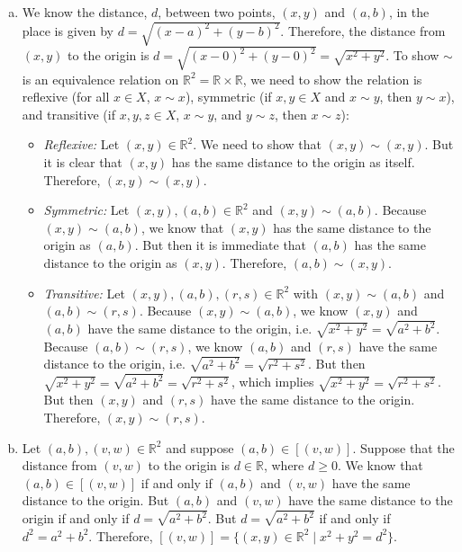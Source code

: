 \documentclass[11pt,letterpaper]{article}
\begin{document}
\sol 
\begin{enumerate}[(a)]
\item We know the distance, $d$, between two points, $(x, y)$ and $(a, b)$, in the place is given by $d= \sqrt{(x - a)^2 + (y - b)^2}$. Therefore, the distance from $(x, y)$ to the origin is $d= \sqrt{(x - 0)^2 + (y - 0)^2}= \sqrt{x^2 + y^2}$. To show $\sim$ is an equivalence relation on $\mathbb{R}^2= \mathbb{R} \times \mathbb{R}$, we need to show the relation is reflexive (for all $x \in X$, $x \sim x$), symmetric (if $x, y \in X$ and $x \sim y$, then $y \sim x$), and transitive (if $x, y, z \in X$, $x \sim y$, and $y \sim z$, then $x \sim z$):
	\begin{itemize}
	\item \textit{Reflexive:} Let $(x, y) \in \mathbb{R}^2$. We need to show that $(x, y) \sim (x, y)$. But it is clear that $(x, y)$ has the same distance to the origin as itself. Therefore, $(x, y) \sim (x, y)$. 
	
	\item \textit{Symmetric:} Let $(x, y), (a, b) \in \mathbb{R}^2$ and $(x, y) \sim (a, b)$. Because $(x, y) \sim (a, b)$, we know that $(x, y)$ has the same distance to the origin as $(a, b)$. But then it is immediate that $(a, b)$ has the same distance to the origin as $(x, y)$. Therefore, $(a, b) \sim (x, y)$. 
	
	\item \textit{Transitive:} Let $(x, y), (a, b), (r, s) \in \mathbb{R}^2$ with $(x, y) \sim (a, b)$ and $(a, b) \sim (r, s)$. Because $(x, y) \sim (a, b)$, we know $(x, y)$ and $(a, b)$ have the same distance to the origin, i.e. $\sqrt{x^2+ y^2}= \sqrt{a^2 + b^2}$. Because $(a, b) \sim (r, s)$, we know $(a, b)$ and $(r, s)$ have the same distance to the origin, i.e. $\sqrt{a^2 + b^2}= \sqrt{r^2 + s^2}$. But then $\sqrt{x^2 + y^2}= \sqrt{a^2 + b^2}= \sqrt{r^2 + s^2}$, which implies $\sqrt{x^2 + y^2}= \sqrt{r^2 + s^2}$. But then $(x, y)$ and $(r, s)$ have the same distance to the origin. Therefore, $(x, y) \sim (r, s)$. 
	\end{itemize} \pspace

\item Let $(a, b), (v, w) \in \mathbb{R}^2$ and suppose $(a, b) \in [(v, w)]$. Suppose that the distance from $(v, w)$ to the origin is $d  \in \mathbb{R}$, where $d \geq 0$. We know that $(a, b) \in [(v, w)]$ if and only if $(a, b)$ and $(v, w)$ have the same distance to the origin. But $(a, b)$ and $(v, w)$ have the same distance to the origin if and only if $d= \sqrt{a^2 + b^2}$. But $d= \sqrt{a^2 + b^2}$ if and only if $d^2= a^2 + b^2$. Therefore, $[(v, w)]= \{ (x, y) \in \mathbb{R}^2 \mid x^2 + y^2= d^2 \}$. \pspace


\end{enumerate}
\end{document}
